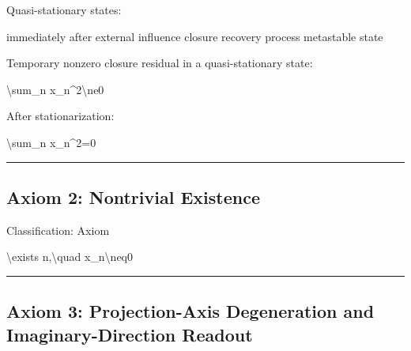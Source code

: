 \documentclass[
  a4paper,
]{article}
\newenvironment{Shaded}{}{}
\newcommand{\NormalTok}[1]{#1}
\begin{document}
Quasi-stationary states:

\begin{Shaded}
\begin{Highlighting}[]
\NormalTok{immediately after external influence}
\NormalTok{closure recovery process}
\NormalTok{metastable state}
\end{Highlighting}
\end{Shaded}

Temporary nonzero closure residual in a quasi-stationary state:

\begin{Shaded}
\begin{Highlighting}[]
\NormalTok{\textbackslash{}sum\_n x\_n\^{}2\textbackslash{}ne0}
\end{Highlighting}
\end{Shaded}

After stationarization:

\begin{Shaded}
\begin{Highlighting}[]
\NormalTok{\textbackslash{}sum\_n x\_n\^{}2=0}
\end{Highlighting}
\end{Shaded}

\begin{center}\rule{0.5\linewidth}{0.5pt}\end{center}

\subsection{Axiom 2: Nontrivial
Existence}\label{axiom-2-nontrivial-existence}

Classification: Axiom

\begin{Shaded}
\begin{Highlighting}[]
\NormalTok{\textbackslash{}exists n,\textbackslash{}quad x\_n\textbackslash{}neq0}
\end{Highlighting}
\end{Shaded}

\begin{center}\rule{0.5\linewidth}{0.5pt}\end{center}

\subsection{Axiom 3: Projection-Axis Degeneration and
Imaginary-Direction
Readout}\label{axiom-3-projection-axis-degeneration-and-imaginary-direction-readout}
\end{document}
